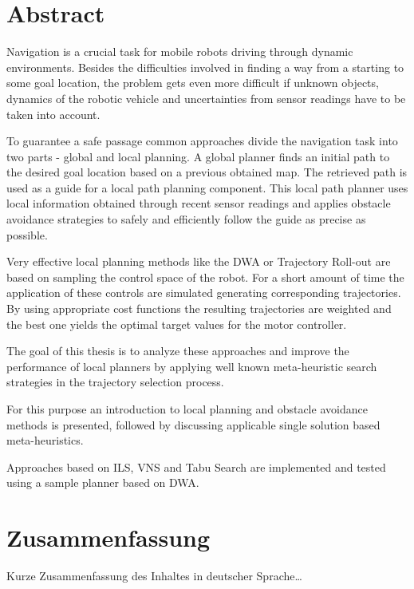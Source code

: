 \begingroup
\let\clearpage\relax
\let\cleardoublepage\relax
\let\cleardoublepage\relax

\chapter*{Abstract}
Navigation is a crucial task for mobile robots driving through dynamic environments.
Besides the difficulties involved in finding a way from a starting to some goal location, the problem gets even more difficult if unknown objects, dynamics of the robotic vehicle and uncertainties from sensor readings have to be taken into account.

To guarantee a safe passage common approaches divide the navigation task into two parts - global and local planning.
A global planner finds an initial path to the desired goal location based on a previous obtained map. The retrieved path is used as a guide for a local path planning component.
This local path planner uses local information obtained through recent sensor readings and applies obstacle avoidance strategies to safely and efficiently follow the guide as precise as possible. 

Very effective local planning methods like the \ac{DWA} or Trajectory Roll-out are based on sampling the control space of the robot. For a short amount of time the application of these controls are simulated generating corresponding trajectories.
By using appropriate cost functions the resulting trajectories are weighted and the best one yields the optimal target values for the motor controller.

The goal of this thesis is to analyze these approaches and improve the performance of local planners by applying well known meta-heuristic search strategies in the trajectory selection process.

For this purpose an introduction to local planning and obstacle avoidance methods is presented,  followed by discussing applicable single solution based meta-heuristics. 

Approaches based on \ac{ILS}, \ac{VNS} and Tabu Search are implemented and tested using a sample planner based on \ac{DWA}. 


\vfill
\newpage

\chapter*{Zusammenfassung}
Kurze Zusammenfassung des Inhaltes in deutscher Sprache\dots


\endgroup			

\vfill